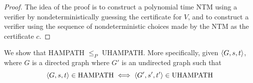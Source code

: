 \begin{proof}
    The idea of the proof is to construct a polynomial time NTM using a verifier by nondeterministically guessing the certificate for $V$, and to construct a verifier using the sequence of nondeterministic choices made by the NTM as the certificate $c$.
\end{proof}

We show that HAMPATH $\leq_P$ UHAMPATH. More specifically, given $\langle G,s,t \rangle$, where $G$ is a directed graph where $G'$ is an undirected graph such that
$$
\langle G,s,t \rangle \in \mathrm{HAMPATH} \iff \langle G',s',t' \rangle \in \mathrm{UHAMPATH}
$$